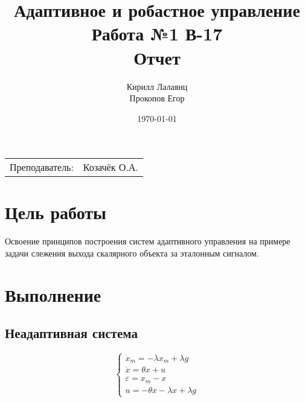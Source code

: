 \documentclass{article}
\title{Адаптивное и робастное управление \\ Работа №1 В-17\\ Отчет} %
\author{Кирилл Лалаянц \\ Прокопов Егор} %
\date{\today} %
\begin{document}
\maketitle %

\begin{center}
\begin{tabular}{l r}
Преподаватель: & Козачёк О.А. %
\end{tabular}
\end{center}
\newpage

\section{Цель работы}


Освоение принципов построения систем адаптивного
управления на примере задачи слежения выхода скалярного объекта за
эталонным сигналом.

\section{Выполнение}
\subsection{Неадаптивная система}
\[
    \begin{cases}
      \dot x_m = -\lambda x_m + \lambda g \\
      \dot x = \theta x + u\\
      \varepsilon = x_m - x \\
      u = - \theta x - \lambda x + \lambda g
    \end{cases}
\]
\end{document}
